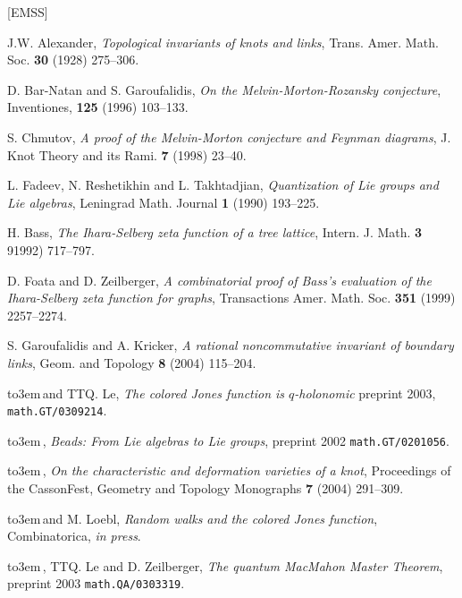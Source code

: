 \documentclass{amsart}
\theoremstyle{plain}
\theoremstyle{definition}
\theoremstyle{remark}
\begin{document}
\ifx\undefined\bysame
        \newcommand{\bysame}{\leavevmode\hbox
to3em{\hrulefill}\,}
\fi
\begin{thebibliography}{[EMSS]}

 J.W. Alexander,
        {\em Topological invariants of knots and links}, 
        Trans. Amer. Math. Soc. {\bf 30} (1928) 275--306.

 D. Bar-Natan and S. Garoufalidis,
        {\em On the Melvin-Morton-Rozansky conjecture}, 
        Inventiones, {\bf 125} (1996) 103--133.

 S. Chmutov,
        {\em A proof of the Melvin-Morton conjecture and Feynman diagrams},
        J. Knot Theory and its Rami. {\bf 7} (1998) 23--40.

 L. Fadeev, N. Reshetikhin and L. Takhtadjian,
        {\em Quantization of Lie groups and Lie algebras},
        Leningrad Math. Journal {\bf 1} (1990) 193--225.

 H. Bass,
        {\em The Ihara-Selberg zeta function of a tree lattice},
        Intern. J. Math. {\bf 3} 91992) 717--797.

 D. Foata and D. Zeilberger,
        {\em A combinatorial proof of Bass's evaluation of the Ihara-Selberg
        zeta function for graphs}, 
        Transactions Amer. Math. Soc. {\bf 351} (1999)  2257--2274.

 S. Garoufalidis and A. Kricker,
        {\em A rational noncommutative invariant of boundary links}, 
        Geom. and Topology {\bf 8} (2004) 115--204.

 \bysame and TTQ. Le,
        {\em The colored Jones function is $q$-holonomic}
        preprint 2003, {\tt math.GT/0309214}.

 \bysame,
        {\em Beads: From Lie algebras to Lie groups},
        preprint 2002 {\tt math.GT/0201056}.

 \bysame,
        {\em On the characteristic and deformation varieties of a knot},
        Proceedings of the CassonFest,
        Geometry and Topology Monographs {\bf 7} (2004) 291--309.

 \bysame and M. Loebl,
        {\em Random walks and the colored Jones function},
        Combinatorica, {\em in press}.

 \bysame, TTQ. Le and D. Zeilberger,
        {\em The quantum MacMahon Master Theorem},
        preprint 2003 {\tt math.QA/0303319}.


\end{thebibliography}
\end{document}
